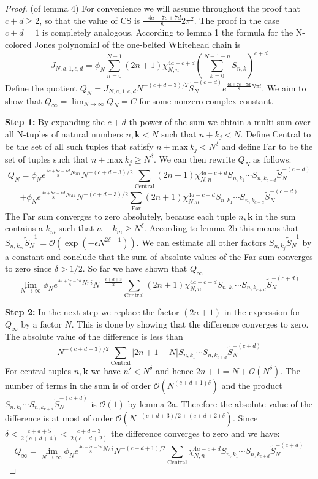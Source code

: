 \documentclass[letterpaper]{article}
\begin{document}
\begin{proof} (of lemma 4)
For convenience we will assume throughout the proof that $c+d \geq 2$, so that the value of CS is $\frac{-4a-7c+7d}{8}2\pi^2$. The proof in the case $c+d =1$ is completely analogous. According to lemma 1 the formula for the N-colored Jones polynomial of the one-belted
Whitehead chain is
$$J_{N,a,1,c,d} =  \phi_N\sum_{n=0}^{N-1}(2n+1)\chi_{N,n}^{4a-c+d}\left(\sum_{k=0}^{N-1-n} S_{n,k}\right)^{c+d}$$
Define the quotient $Q_N =
J_{N,a,1,c,d}N^{-(c+d+3)/2}\tilde{S}_N^{-(c+d)}e^{\frac{4a+7c-7d}{8}N\pi
i}$. We aim to show that $Q_\infty = \lim_{N\to\infty}Q_N = C$ for
some nonzero complex constant.\newline

\noindent\textbf{Step 1:} By expanding the $c+d$-th power of the
sum we obtain a multi-sum over all N-tuples of natural numbers
$n,\mathbf{k}<N$ such that $n+k_j<N$. Define Central to be the set
of all such tuples that satisfy $n+ \mathrm{max}\ k_j < N^\delta$
and define Far to be the set of tuples such that $n+ \mathrm{max}\
k_j \geq N^\delta$. We can then rewrite $Q_N$ as follows:
$$Q_N=\phi_N e^{\frac{4a+7c-7d}{8}N\pi i} N^{-(c+d+3)/2}\sum_{\mathrm{Central}}(2n+1)\chi_{N,n}^{4a-c+d}S_{n,k_1}\cdots S_{n,k_{c+d}}\tilde{S}_N^{-(c+d)}$$ $$+\phi_N e^{\frac{4a+7c-7d}{8}N\pi i} N^{-(c+d+3)/2}\sum_{\mathrm{Far}}(2n+1)\chi_{N,n}^{4a-c+d}S_{n,k_1}\cdots S_{n,k_{c+d}}\tilde{S}_N^{-(c+d)}$$
The Far sum converges to zero absolutely, because each tuple
$n,\mathbf{k}$ in the sum contains a $k_m$ such that $n+k_m\geq
N^\delta$. According to lemma 2b this means that
$S_{n,k_m}\tilde{S}_N^{-1}=\mathcal{O}(\exp(-\epsilon
N^{2\delta-1}))$. We can estimate all other factors
$S_{n,k_j}\tilde{S}_N^{-1}$ by a constant and conclude that the
sum of absolute values of the Far sum converges to zero since $\delta > 1/2$. So far we have shown that $Q_\infty=$ $$\lim_{N\to\infty} \phi_N e^{\frac{4a+7c-7d}{8}N\pi i} N^{-\frac{c+d+3}{2}}\sum_{\mathrm{Central}}(2n+1)\chi_{N,n}^{4a-c+d}S_{n,k_1}\cdots S_{n,k_{c+d}}\tilde{S}_N^{-(c+d)}$$

\noindent \textbf{Step 2:} In the next step we replace the factor $(2n+1)$
in the expression for $Q_\infty$ by a factor $N$. This is done by
showing that the difference converges to zero. The absolute value
of the difference is less than
$$N^{-(c+d+3)/2}\sum_{\mathrm{Central}}|2n+1-N|S_{n,k_1}\cdots
S_{n,k_{c+d}}\tilde{S}_N^{-(c+d)}$$ For central tuples
$n,\mathbf{k}$ we have $n'<N^\delta$ and hence
$2n+1=N+\mathcal{O}(N^\delta)$. The number of terms in the sum is
of order $\mathcal{O}(N^{(c+d+1)\delta})$ and the product
$S_{n,k_1}\cdots S_{n,k_{c+d}}\tilde{S}_N^{-(c+d)}$ is $\mathcal{O}(1)$ by lemma 2a. Therefore the absolute value of the
difference is at most of order
$\mathcal{O}(N^{-(c+d+3)/2+(c+d+2)\delta})$. Since $\delta <
\frac{c+d+5}{2(c+d+4)}<\frac{c+d+3}{2(c+d+2)}$ the difference
converges to zero and we have: $$Q_\infty= \lim_{N\to\infty}\phi_N
e^{\frac{4a+7c-7d}{8}N\pi i}
N^{-(c+d+1)/2}\sum_{\mathrm{Central}}\chi_{N,n}^{4a-c+d}S_{n,k_1}\cdots
S_{n,k_{c+d}}\tilde{S}_N^{-(c+d)}$$


\end{proof}
\end{document}
